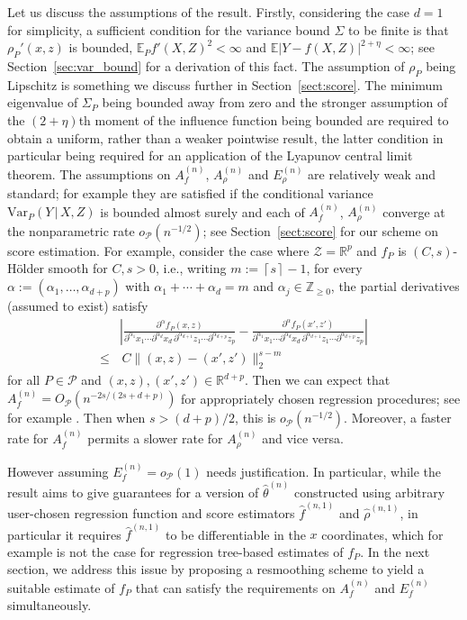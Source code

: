 \documentclass[aos]{imsart}
\newcommand{\abs}[1]{\left| #1\right|}
\newcommand{\R}{\mathbb{R}}
\newcommand{\E}{\mathbb{E}}
\newcommand{\ceil}[1]{\left\lceil #1 \right\rceil}
\newcommand{\Var}{\mathrm{Var}}
\newcommand{\given}{\,|\,}
\begin{document}
	Let us discuss the assumptions of the result. Firstly, 	considering the case $d=1$ for simplicity, a sufficient condition for the variance bound $\Sigma$ to be finite is that $\rho_P'(x, z)$ is bounded, $\E_P f'(X, Z)^2 < \infty$ and $\E|Y-f(X, Z)|^{2+\eta} < \infty$; see Section~\ref{sec:var_bound} for a derivation of this fact. The assumption of $\rho_P$ being Lipschitz is something we discuss further in Section~\ref{sect:score}. 
	The minimum eigenvalue of $\Sigma_P$ being bounded away from zero and the stronger assumption of the $(2+\eta)$th moment of the influence function being bounded are required to obtain a uniform, rather than a weaker pointwise result, the latter condition in particular being required for an application of the Lyapunov central limit theorem.
	The assumptions on $A_f^{(n)}$, $A_\rho^{(n)}$ and $E_\rho^{(n)}$ are relatively weak and standard; for example they are satisfied if the conditional variance $\Var_P(Y \given  X,Z)$ is bounded almost surely and each of $A_f^{(n)}$, $A_\rho^{(n)}$ converge at the nonparametric rate $o_{\mathcal{P}}(n^{-1/2})$; see Section~\ref{sect:score} for our scheme on score estimation. For example, consider the case where $\mathcal{Z} = \R^p$ and $f_P$ is $(C,s)$-H\"older smooth for $C,s>0$, i.e., writing $m:=\ceil{s} -1$, for every $\alpha :=(\alpha_1, \ldots, \alpha_{d + p})$ with $\alpha_1 + \cdots + \alpha_d = m$ and $\alpha_j \in \mathbb{Z}_{\geq 0}$, the partial derivatives (assumed to exist) satisfy
	\begin{align*}
	&\abs{\frac{\partial^\alpha f_P (x, z)}{\partial^{\alpha_1} x_1 \cdots \partial^{\alpha_d} x_d \, \partial^{\alpha_{d+1}} z_1 \cdots \partial^{\alpha_{d+p}} z_p} - \frac{\partial^\alpha f_P (x', z')}{\partial^{\alpha_1} x_1 \cdots \partial^{\alpha_d} x_d \, \partial^{\alpha_{d+1}} z_1 \cdots \partial^{\alpha_{d+p}} z_p}}\\
	\leq &  \, C \| (x, z) - (x', z')\|_2^{s - m}
	\end{align*}
	for all $P \in \mathcal{P}$ and $(x, z), (x', z') \in \R^{d+p}$.
	Then we can expect that $A_f^{(n)} = O_{\mathcal{P}}(n^{-2s / (2s + d + p)})$ for appropriately chosen regression procedures; see for example \citet{gyorfi2002distribution}. Then when $s > (d+p)/2$, this is $o_{\mathcal{P}}(n^{-1/2})$.
	Moreover, a faster rate for $A_f^{(n)}$ permits a slower rate for $A_\rho^{(n)}$ and vice versa.
	
	However assuming $E_f^{(n)}=o_{\mathcal{P}}(1)$ needs justification. In particular, while the result aims to give guarantees for a version of $\hat{\theta}^{(n)}$ constructed using arbitrary user-chosen regression function and score estimators $\hat{f}^{(n,1)}$ and $\hat{\rho}^{(n,1)}$, in particular it requires $\hat{f}^{(n,1)}$ to be differentiable in the $x$ coordinates, which for example is not the case for regression tree-based estimates of $f_P$. In the next section, we  address this issue by proposing a resmoothing scheme to yield a suitable estimate of $f_P$ that can satisfy the requirements on $A_f^{(n)}$ and $E_f^{(n)}$ simultaneously.
	
\end{document}
